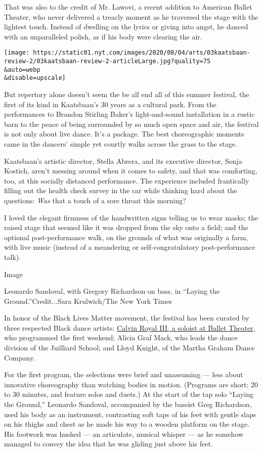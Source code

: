 That was also to the credit of Mr. Lawovi, a recent addition to American
Ballet Theater, who never delivered a treacly moment as he traversed the
stage with the lightest touch. Instead of dwelling on the lyrics or
giving into angst, he danced with an unparalleled polish, as if his body
were clearing the air.

\texttt{[image: https://static01.nyt.com/images/2020/08/04/arts/03kaatsbaan-review-2/03kaatsbaan-review-2-articleLarge.jpg?quality=75\\\&auto=webp\\\&disable=upscale]}

But repertory alone doesn't seem the be all end all of this summer
festival, the first of its kind in Kaatsbaan's 30 years as a cultural
park. From the performances to Brandon Stirling Baker's light-and-sound
installation in a rustic barn to the peace of being surrounded by so
much open space and air, the festival is not only about live dance. It's
a package. The best choreographic moments came in the dancers' simple
yet courtly walks across the grass to the stage.

Kaatsbaan's artistic director, Stella Abrera, and its executive
director, Sonja Kostich, aren't messing around when it comes to safety,
and that was comforting, too, at this socially distanced performance.
The experience included frantically filling out the health check survey
in the car while thinking hard about the questions: \emph{Was} that a
touch of a sore throat this morning?

I loved the elegant firmness of the handwritten signs telling us to wear
masks; the raised stage that seemed like it was dropped from the sky
onto a field; and the optional post-performance walk, on the grounds of
what was originally a farm, with live music (instead of a meandering or
self-congratulatory post-performance talk).

Image

Leonardo Sandoval, with Gregory Richardson on bass, in ``Laying the
Ground.''Credit...Sara Krulwich/The New York Times

In honor of the Black Lives Matter movement, the festival has been
curated by three respected Black dance artists:
\href{https://www.abt.org/people/calvin-royal/?type=performer\&gclid=Cj0KCQjwyJn5BRDrARIsADZ9ykGukwgjIfy5GS0uVFO0vpgqra8aXLyIqvL8ApaOarDXLchnTxIYBTMaAqtmEALw_wcB}{Calvin
Royal III, a soloist at Ballet Theater}, who programmed the first
weekend; Alicia Graf Mack, who leads the dance division of the Juilliard
School; and Lloyd Knight, of the Martha Graham Dance Company.

For the first program, the selections were brief and unassuming --- less
about innovative choreography than watching bodies in motion. (Programs
are short: 20 to 30 minutes, and feature solos and duets.) At the start
of the tap solo ``Laying the Ground,'' Leonardo Sandoval, accompanied by
the bassist Greg Richardson, used his body as an instrument, contrasting
soft taps of his feet with gentle slaps on his thighs and chest as he
made his way to a wooden platform on the stage. His footwork was hushed
--- an articulate, musical whisper --- as he somehow managed to convey
the idea that he was gliding just above his feet.

